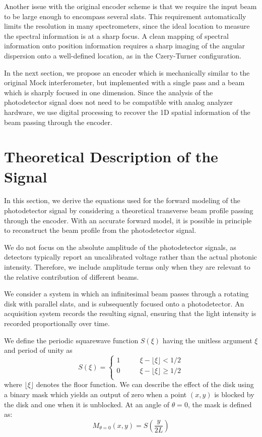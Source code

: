 \documentclass[8pt,a4paper]{report}
\begin{document}
	Another issue with the original encoder scheme is that we require the input beam to be large enough to encompass several slats. This requirement automatically limits the resolution in many spectrometers, since the ideal location to measure the spectral information is at a sharp focus. A clean mapping of spectral information onto position information requires a sharp imaging of the angular dispersion onto a well-defined location, as in the Czery-Turner configuration.
	
	In the next section, we propose an encoder which is mechanically similar to the original Mock interferometer, but implemented with a single pass and a beam which is sharply focused in one dimension. Since the analysis of the photodetector signal does not need to be compatible with analog analyzer hardware, we use digital processing to recover the 1D spatial information of the beam passing through the encoder.
	
	\section{Theoretical Description of the Signal}
	In this section, we derive the equations used for the forward modeling of the photodetector signal by considering a theoretical transverse beam profile passing through the encoder. With an accurate forward model, it is possible in principle to reconstruct the beam profile from the photodetector signal.
	
	We do not focus on the absolute amplitude of the photodetector signals, as detectors typically report an uncalibrated voltage rather than the actual photonic intensity. Therefore, we include amplitude terms only when they are relevant to the relative contribution of different beams.
	
	We consider a system in which an infinitesimal beam passes through a rotating disk with parallel slats, and is subsequently focused onto a photodetector. An acquisition system records the resulting signal, ensuring that the light intensity is recorded proportionally over time.
	
	We define the periodic squarewave function $S(\xi)$ having the unitless argument $\xi$ and period of unity as
	\begin{equation}
		S(\xi) =
		\begin{cases}
			1 &\qquad \xi - \lfloor \xi \rfloor < 1/2 \\
			0 &\qquad \xi - \lfloor \xi \rfloor \ge 1/2 \\
		\end{cases}
	\end{equation}
	where $\lfloor \xi \rfloor$ denotes the floor function. We can describe the effect of the disk using a binary mask which yields an output of zero when a point $(x,y)$ is blocked by the disk and one when it is unblocked. At an angle of $\theta=0$, the mask is defined as:
	\begin{equation}
		M_{\theta=0}(x,y) = S\left(\frac{y}{2L}\right)
	\end{equation}
	
\end{document}
